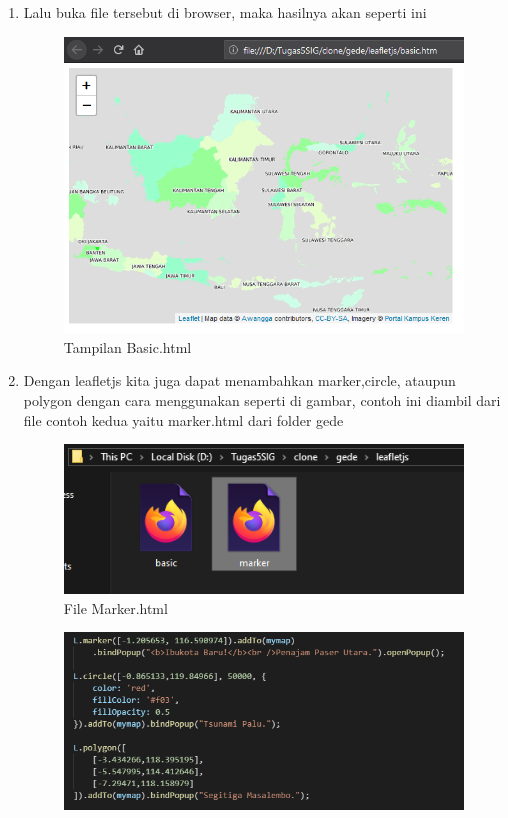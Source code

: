 \begin{enumerate}
\begin{figure}[H]
	\end{figure}
    \item Lalu buka file tersebut di browser, maka hasilnya akan seperti ini
    \hfill\break
    \begin{figure}[H]
		\includegraphics[width=12cm]{figures/Tugas5/1174089/3.png}
		\centering
		\caption{Tampilan Basic.html}
	\end{figure}
    \item Dengan leafletjs kita juga dapat menambahkan marker,circle, ataupun polygon dengan cara menggunakan seperti di gambar, contoh ini diambil dari file contoh kedua yaitu marker.html dari folder gede 
    \hfill\break
    \begin{figure}[H]
		\includegraphics[width=12cm]{figures/Tugas5/1174089/4.png}
		\centering
		\caption{File Marker.html}
	\end{figure}
	\begin{figure}[H]
		\includegraphics[width=12cm]{figures/Tugas5/1174089/6.png}

\end{figure}
\end{enumerate}
